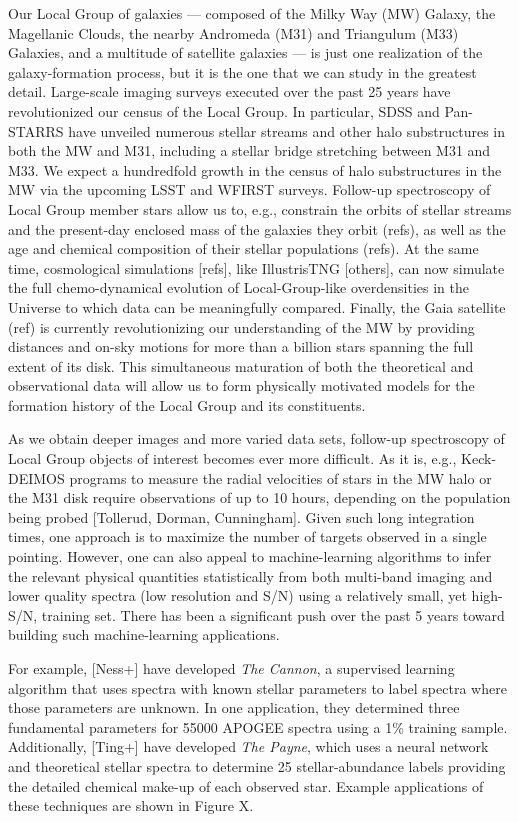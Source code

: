 \documentclass[oneside,11pt]{amsart}
\begin{document}
Our Local Group of galaxies --- composed of the Milky Way (MW) Galaxy,
the Magellanic Clouds, the nearby Andromeda (M31) and Triangulum (M33)
Galaxies, and a multitude of satellite galaxies --- is just one
realization of the galaxy-formation process, but it is the one that we
can study in the greatest detail.  Large-scale imaging surveys executed
over the past 25 years have revolutionized our census of the Local
Group.  In particular, SDSS and Pan-STARRS have unveiled numerous
stellar streams and other halo substructures in both the MW and M31,
including a stellar bridge stretching between M31 and M33.  We expect a
hundredfold growth in the census of halo substructures in the MW via the
upcoming LSST and WFIRST surveys.  Follow-up spectroscopy of Local Group
member stars allow us to, e.g., constrain the orbits of stellar streams
and the present-day enclosed mass of the galaxies they orbit (refs), as
well as the age and chemical composition of their stellar populations
(refs).  At the same time, cosmological simulations [refs], like
IllustrisTNG [others], can now simulate the full chemo-dynamical
evolution of Local-Group-like overdensities in the Universe to which
data can be meaningfully compared.  Finally, the Gaia satellite (ref) is
currently revolutionizing our understanding of the MW by providing
distances and on-sky motions for more than a billion stars spanning the
full extent of its disk.  This simultaneous maturation of both the
theoretical and observational data will allow us to form physically
motivated models for the formation history of the Local Group and its
constituents.

As we obtain deeper images and more varied data sets, follow-up
spectroscopy of Local Group objects of interest becomes ever more
difficult.  As it is, e.g., Keck-DEIMOS programs to measure the radial
velocities of stars in the MW halo or the M31 disk require observations
of up to 10 hours, depending on the population being probed [Tollerud,
Dorman, Cunningham].  Given such long integration times, one approach is
to maximize the number of targets observed in a single pointing.
However, one can also appeal to machine-learning algorithms to infer the
relevant physical quantities statistically from both multi-band imaging
and lower quality spectra (low resolution and S/N) using a relatively
small, yet high-S/N, training set.  There has been a significant push
over the past 5 years toward building such machine-learning
applications.

For example, [Ness+] have developed {\it The Cannon}, a supervised
learning algorithm that uses spectra with known stellar parameters to
label spectra where those parameters are unknown.  In one application,
they determined three fundamental parameters for 55000 APOGEE spectra
using a 1\% training sample.  Additionally, [Ting+] have developed {\it
The Payne}, which uses a neural network and theoretical stellar spectra
to determine 25 stellar-abundance labels providing the detailed chemical
make-up of each observed star.  Example applications of these techniques
are shown in Figure X.
\end{document}
